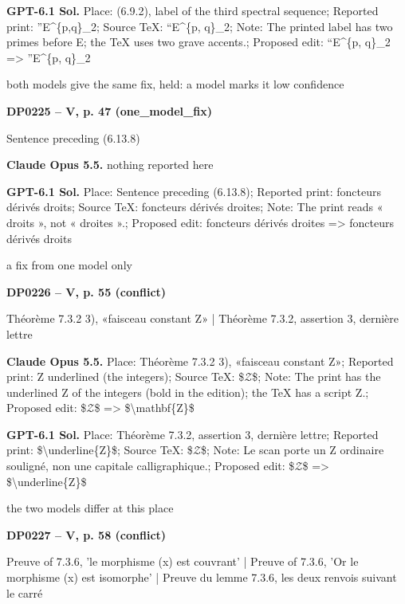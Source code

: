 \textbf{GPT-6.1 Sol.} Place: (6.9.2), label of the third spectral sequence; Reported print: ''E\textasciicircum{}\{p,q\}\_2; Source TeX: ``E\textasciicircum{}\{p, q\}\_2; Note: The printed label has two primes before E; the TeX uses two grave accents.; Proposed edit: ``E\textasciicircum{}\{p, q\}\_2 =\allowbreak > ''E\textasciicircum{}\{p, q\}\_2\par
both models give the same fix, held: a model marks it low confidence\par
\par\noindent\hypertarget{DP0225}{}\textbf{DP0225 -- V, p. 47 (one\_model\_fix)}\par
Sentence preceding (6.13.8)\par
\textbf{Claude Opus 5.5.} nothing reported here\par
\textbf{GPT-6.1 Sol.} Place: Sentence preceding (6.13.8); Reported print: foncteurs dérivés droits; Source TeX: foncteurs dérivés droites; Note: The print reads « droits », not « droites ».; Proposed edit: foncteurs dérivés droites =\allowbreak > foncteurs dérivés droits\par
a fix from one model only\par
\par\noindent\hypertarget{DP0226}{}\textbf{DP0226 -- V, p. 55 (conflict)}\par
Théorème 7.3.2 3), «faisceau constant Z» | Théorème 7.3.2, assertion 3, dernière lettre\par
\textbf{Claude Opus 5.5.} Place: Théorème 7.3.2 3), «faisceau constant Z»; Reported print: Z underlined (the integers); Source TeX: \$\ensuremath{𝒵}\$; Note: The print has the underlined Z of the integers (bold in the edition); the TeX has a script Z.; Proposed edit: \$\ensuremath{𝒵}\$ =\allowbreak > \$\textbackslash{}mathbf\{Z\}\$\par
\textbf{GPT-6.1 Sol.} Place: Théorème 7.3.2, assertion 3, dernière lettre; Reported print: \$\textbackslash{}underline\{Z\}\$; Source TeX: \$\ensuremath{𝒵}\$; Note: Le scan porte un Z ordinaire souligné, non une capitale calligraphique.; Proposed edit: \$\ensuremath{𝒵}\$ =\allowbreak > \$\textbackslash{}underline\{Z\}\$\par
the two models differ at this place\par
\par\noindent\hypertarget{DP0227}{}\textbf{DP0227 -- V, p. 58 (conflict)}\par
Preuve of 7.3.6, 'le morphisme (x) est couvrant' | Preuve of 7.3.6, 'Or le morphisme (x) est isomorphe' | Preuve du lemme 7.3.6, les deux renvois suivant le carré\par
